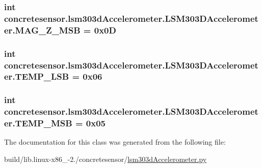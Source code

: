 \subsubsection[{M\+A\+G\+\_\+\+Z\+\_\+\+M\+S\+B}]{\setlength{\rightskip}{0pt plus 5cm}int concretesensor.\+lsm303d\+Accelerometer.\+L\+S\+M303\+D\+Accelerometer.\+M\+A\+G\+\_\+\+Z\+\_\+\+M\+S\+B = 0x0\+D\hspace{0.3cm}{\ttfamily [static]}}\label{classconcretesensor_1_1lsm303dAccelerometer_1_1LSM303DAccelerometer_a5224ed7999e35cceb59bbf045dac141c}
\hypertarget{classconcretesensor_1_1lsm303dAccelerometer_1_1LSM303DAccelerometer_a8336618a7d10b8a254cc0558d9418fcc}{}
\subsubsection[{T\+E\+M\+P\+\_\+\+L\+S\+B}]{\setlength{\rightskip}{0pt plus 5cm}int concretesensor.\+lsm303d\+Accelerometer.\+L\+S\+M303\+D\+Accelerometer.\+T\+E\+M\+P\+\_\+\+L\+S\+B = 0x06\hspace{0.3cm}{\ttfamily [static]}}\label{classconcretesensor_1_1lsm303dAccelerometer_1_1LSM303DAccelerometer_a8336618a7d10b8a254cc0558d9418fcc}
\hypertarget{classconcretesensor_1_1lsm303dAccelerometer_1_1LSM303DAccelerometer_adc889ca9c6f86ac9120af0f2968540d8}{}
\subsubsection[{T\+E\+M\+P\+\_\+\+M\+S\+B}]{\setlength{\rightskip}{0pt plus 5cm}int concretesensor.\+lsm303d\+Accelerometer.\+L\+S\+M303\+D\+Accelerometer.\+T\+E\+M\+P\+\_\+\+M\+S\+B = 0x05\hspace{0.3cm}{\ttfamily [static]}}\label{classconcretesensor_1_1lsm303dAccelerometer_1_1LSM303DAccelerometer_adc889ca9c6f86ac9120af0f2968540d8}


The documentation for this class was generated from the following file\+:\begin{DoxyCompactItemize}
\item 
build/lib.\+linux-\/x86\+\_-\/2./concretesensor/\hyperlink{build_2lib_8linux-x86__64-2_87_2concretesensor_2lsm303dAccelerometer_8py}{lsm303d\+Accelerometer.\+py}\end{DoxyCompactItemize}
